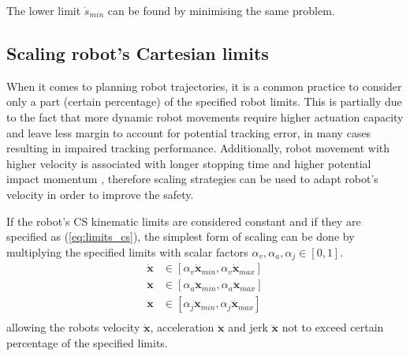 The lower limit $\dot{s}_{min}$ can be found by minimising the same problem.


\subsection{Scaling robot's Cartesian limits}
When it comes to planning robot trajectories, it is a common practice to consider only a part (certain percentage) of the specified robot limits. This is partially due to the fact that more dynamic robot movements require higher actuation capacity and leave less margin to account for potential tracking error, in many cases resulting in impaired tracking performance. Additionally, robot movement with higher velocity is associated with longer stopping time and higher potential impact momentum \cite{smu}, therefore scaling strategies can be used to adapt robot's velocity in order to improve the safety. 

If the robot's CS kinematic limits are considered constant and if they are specified as (\ref{eq:limits_cs}), the simplest form of scaling can be done by multiplying the specified limits with scalar factors $\alpha_v,\alpha_a,\alpha_j\in[0,1]$.
\begin{equation}
\begin{split}
\dot{\bm{x}}&\in  [\alpha_v\dot{\bm{x}}_{min},\alpha_v\dot{\bm{x}}_{max}] \\
\ddot{\bm{x}}&\in  [\alpha_a\ddot{\bm{x}}_{min},\alpha_a\ddot{\bm{x}}_{max}] \\
\dddot{\bm{x}}&\in  [\alpha_j\dddot{\bm{x}}_{min},\alpha_j\dddot{\bm{x}}_{max}] \\
 \end{split} \label{eq:limits_cs_alpha}
\end{equation}
allowing the robots velocity $\dot{\bm{x}}$, acceleration $\ddot{\bm{x}}$ and jerk $\dddot{\bm{x}}$ not to exceed certain percentage of the specified limits. 

